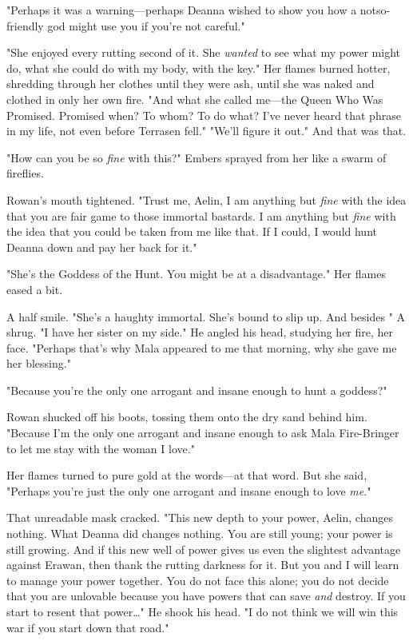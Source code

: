 "Perhaps it was a warning---perhaps Deanna wished to show you how a notso-friendly god might use you if you're not careful."

"She enjoyed every rutting second of it. She \emph{wanted} to see what my power might do, what she could do with my body, with the key." Her flames burned hotter, shredding through her clothes until they were ash, until she was naked and clothed in only her own fire. "And what she called me---the Queen Who Was Promised. Promised when? To whom? To do what? I've never heard that phrase in my life, not even before Terrasen fell." "We'll figure it out." And that was that.

"How can you be so  \emph{fine} with this?" Embers sprayed from her like a swarm of fireflies.

Rowan's mouth tightened. "Trust me, Aelin, I am anything but
\emph{fine} with the idea that you are fair game to those immortal bastards. I am anything but \emph{fine} with the idea that you could be taken from me like that. If I could, I would hunt Deanna down and pay her back for it."

"She's the Goddess of the Hunt. You might be at a disadvantage." Her flames eased a bit.

A half smile. "She's a haughty immortal. She's bound to slip up. And besides  " A shrug. "I have her sister on my side." He angled his head, studying her fire, her face. "Perhaps that's why Mala appeared to me that morning, why she gave me her blessing."

"Because you're the only one arrogant and insane enough to hunt a goddess?"

Rowan shucked off his boots, tossing them onto the dry sand behind him. "Because I'm the only one arrogant and insane enough to ask Mala Fire-Bringer to let me stay with the woman I love."

Her flames turned to pure gold at the words---at that word. But she said, "Perhaps you're just the only one arrogant and insane enough to love \emph{me}."

That unreadable mask cracked. "This new depth to your power, Aelin, changes nothing. What Deanna did changes nothing. You are still young;
your power is still growing. And if this new well of power gives us even the slightest advantage against Erawan, then thank the rutting darkness for it. But you and I will learn to manage your power together. You do not face this alone; you do not decide that you are unlovable because you have powers that can save \emph{and} destroy. If you start to resent that power\ldots" He shook his head. "I do not think we will win this war if you start down that road."


